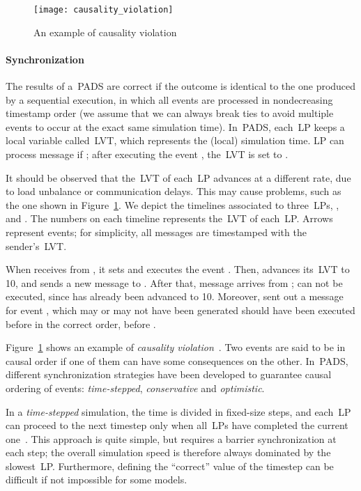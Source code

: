 \documentclass{sigplanconf}
\begin{document}
\begin{figure}[t]
\centering\texttt{[image: causality\_violation]}
\caption{An example of causality violation}\label{fig:causality_violation}
\end{figure}

\paragraph*{Synchronization}
The results of a~\ac{PADS} are correct if the outcome is identical to
the one produced by a sequential execution, in which all events are
processed in nondecreasing timestamp order (we assume that we can
always break ties to avoid multiple events to occur at the exact same
simulation time). In~\ac{PADS}, each~\ac{LP}  keeps a local
variable  called~\ac{LVT}, which represents the
(local) simulation time. \ac{LP}  can process message 
if ; after executing the event , the~\ac{LVT}
is set to .

It should be observed that the~\ac{LVT} of each~\ac{LP} advances at a
different rate, due to load unbalance or communication delays. This
may cause problems, such as the one shown in
Figure~\ref{fig:causality_violation}. We depict the timelines
associated to three~\acp{LP}, ,  and
. The numbers on each timeline represents the~\ac{LVT}
of each~\ac{LP}. Arrows represent events; for simplicity, all messages
are timestamped with the sender's~\ac{LVT}.

When  receives  from , it
sets  and executes the event . Then,
 advances its~\ac{LVT} to 10, and sends a new message
 to . After that, message 
arrives from ;  can not be executed, since
 has already been advanced to 10. Moreover,
 sent out a message  for event ,
which may or may not have been generated should  have been
executed before in the correct order, before .

Figure~\ref{fig:causality_violation} shows an example of
\emph{causality violation}~\cite{Lamport78}. Two events are said to
be in causal order if one of them can have some consequences on the
other. In~\ac{PADS}, different synchronization strategies have been
developed to guarantee causal ordering of events: \emph{time-stepped},
\emph{conservative} and \emph{optimistic}.

In a \emph{time-stepped} simulation, the time is divided in fixed-size
steps, and each~\ac{LP} can proceed to the next timestep only when
all~\acp{LP} have completed the current one~\cite{1261535}.  This
approach is quite simple, but requires a barrier synchronization at
each step; the overall simulation speed is therefore always dominated
by the slowest~\ac{LP}. Furthermore, defining the ``correct'' value of
the timestep can be difficult if not impossible for some models.
\end{document}
